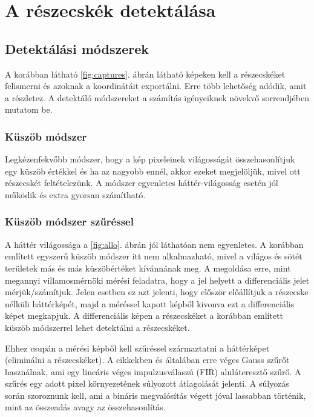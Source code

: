 \chapter{A részecskék detektálása}

\section{Detektálási módszerek}
	A korábban látható \ref{fig:captures}. ábrán látható képeken kell a részecskéket felismerni és
	azoknak a koordinátáit exportálni.
	Erre több lehetőség adódik, amit a \cite{Feng2007} részletez.
	A detektáló módszereket a számítás igényeiknek növekvő sorrendjében mutatom be.
\subsection{Küszöb módszer}
	Legkézenfekvőbb módszer, hogy a kép pixeleinek világosságát összehasonlítjuk egy küszöb értékkel
	és ha az nagyobb ennél, akkor ezeket megjelöljük, mivel ott részecskét feltételezünk. 
	A módszer egyenletes háttér-világosság esetén jól működik és extra gyorsan számítható.
\subsection{Küszöb módszer szűréssel}
	A háttér világossága a \ref{fig:allo}. ábrán jól láthatóan nem egyenletes.
	A korábban említett egyszerű küszöb módszer itt nem alkalmazható, mivel a világos és sötét
	területek más és más küszöbértéket kívánnának meg.
	A megoldása erre, mint megannyi villamosmérnöki mérési feladatra, hogy a jel helyett a
	differenciális jelet mérjük/számítjuk. Jelen esetben ez azt jelenti, hogy először előállítjuk a
	részecske nélküli háttérképét, majd a méréssel kapott képből kivonva ezt a differenciális képet megkapjuk.
	A differenciális képen a részecskéket a korábban említett küszöb módszerrel lehet detektálni a
	részecskéket.
	
	Ehhez csupán a mérési képből kell szűréssel származtatni a háttérképet (eliminálni a részecskéket).
	A \cite{Feng2007,Oxtoby2010} cikkekben és általában erre véges Gauss szűrőt használnak, ami egy
	lineáris véges impulzusválaszú (FIR) aluláteresztő szűrő.
	A szűrés egy adott pixel környezetének súlyozott átlagolását jelenti.
	A súlyozás során szoroznunk kell, ami a bináris megvalósítás végett jóval lassabban történik, mint az
	összeadás avagy az összehasonlítás.
	
